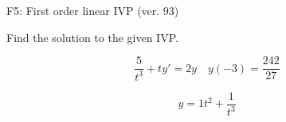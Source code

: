 \begin{exercise}
  \begin{exerciseTitle}F5: First order linear IVP (ver. 93)\end{exerciseTitle}
  \begin{exerciseStatement}
    
Find the solution to the given IVP.

    
\[\frac{5}{t^{3}} +ty'= 2 y \hspace{1em} y( -3 ) = \frac{242}{27}\]

  \end{exerciseStatement}
  \begin{exerciseAnswer}
    
\[y= 1 t^ 2 + \frac{1}{t^{3}}\]

  \end{exerciseAnswer}
\end{exercise}